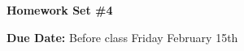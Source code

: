 
\usepackage{braket}

\def\ketY{\ensuremath{\ket {\Psi}}}
\def\iGeV{\ensuremath{\textrm{GeV}^{-1}}}
\def\mp{\ensuremath{m_{\textrm{proton}}}}
\def\rp{\ensuremath{r_{\textrm{proton}}}}
\def\me{\ensuremath{m_{\textrm{electron}}}}
\def\aG{\ensuremath{\alpha_G}}
\def\rAtom{\ensuremath{r_{\textrm{atom}}}}
\def\rNucl{\ensuremath{r_{\textrm{nucleus}}}}
\def\GN{\ensuremath{\textrm{G}_\textrm{N}}}

\def\be{\begin{equation*}}
\def\ee{\end{equation*}}


\usepackage{fancyhdr}
\usepackage{cancel}




\fancyhf{}

\thispagestyle{fancy}






\begin{center}
{\huge \textbf{Homework Set \#4}}
\large

{\textbf{ Due Date:} Before class Friday February 15th  } 
\end{center}

